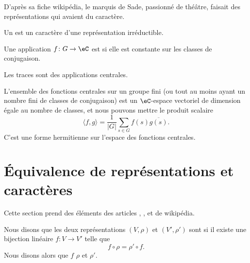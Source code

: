 \tiny
D'après sa fiche wikipédia, le marquis de Sade, passionné de théâtre, faisait des représentations qui avaient du caractère.
\normalsize


Un  est un caractère d'une représentation irréductible.

\begin{definition}
    Une application \( f\colon G\to \eC\) est  si elle est constante sur les classes de conjugaison.
\end{definition}
Les traces sont des applications centrales.

L'ensemble des fonctions centrales sur un groupe fini (ou tout au moins ayant un nombre fini de classes de conjugaison) est un \( \eC\)-espace vectoriel de dimension égale au nombre de classes, et nous pouvons mettre le produit scalaire
\begin{equation}    \label{EqJrEpVI}
    \langle f, g\rangle =\frac{1}{ | G | }\sum_{s\in G}f(s)\overline{ g(s) }.
\end{equation}
C'est une forme hermitienne sur l'espace des fonctions centrales.

\section{Équivalence de représentations et caractères}

Cette section prend des éléments des articles , ,  et  de wikipédia.

\begin{definition}
    Nous disons que les deux représentations \( (V,\rho)\) et \( (V',\rho')\) sont  si il existe une bijection linéaire \( f\colon V\to V'\) telle que
    \begin{equation}
        f\circ \rho=\rho'\circ f.
    \end{equation}
    Nous disons alors que \( f\)  \( \rho\) et \( \rho'\).
\end{definition}

